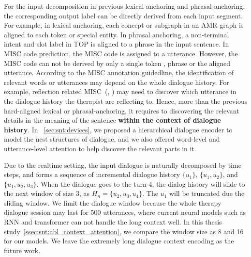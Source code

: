 For the input decomposition in previous lexical-anchoring and
phrasal-anchoring, the corresponding output label can be directly
derived from each input segment. For example, in lexical anchoring,
each concept or subgraph in an AMR graph is aligned to each token
or special entity. In phrasal anchoring, a non-terminal intent and
slot label in TOP is aligned to a phrase in the input sentence. In
MISC code prediction, the MISC code is assigned to a
utterance. However, the MISC code can not be derived by only a single token
, phrase or the aligned utterance. According to the MISC annotation
guidedline, the identification of relevant words or utterances may
depend on the whole dialogue history. For example, reflection related
MISC~(\RES, \REC) may need to discover which utterance in the dialogue
history the therapist are reflecting to. Hence, more than the previous
hard-aligned lexical or phrasal-anchoring, it requires to discovering
the relevant details in the meaning of the sentence \textbf{within the
  context of dialogue history}. In ~\autoref{sec:snt:devices}, we
proposed a hierarchical dialogue encoder to model the nest structures
of dialogue, and we also offered word-level and utterance-level
attention to help discover the relevant parts in it.

Due to the realtime setting, the input dialogue is naturally
decomposed by time steps, and forms a sequence of incremental dialogue
history $\{u_1\}$, $\{u_1,u_2\}$, and $\{u_1,u_2,u_3\}$.  When the dialogue goes to the turn 4, the dialog history will
slide to the next window of size 3, as $H_{n}=\{u_2,u_3,u_4\}$. The
$u_{1}$ will be truncated due the sliding window. We limit the
dialogue window because the whole therapy dialogue session may last
for 500 utterances, where current neural models such as RNN and
transformer can not handle the long context well.  In this thesis
study~\autoref{ssec:snt:abl_context_attention}, we compare the window
size as 8 and 16 for our models. We leave the extremely long dialogue
context encoding as the future work.

